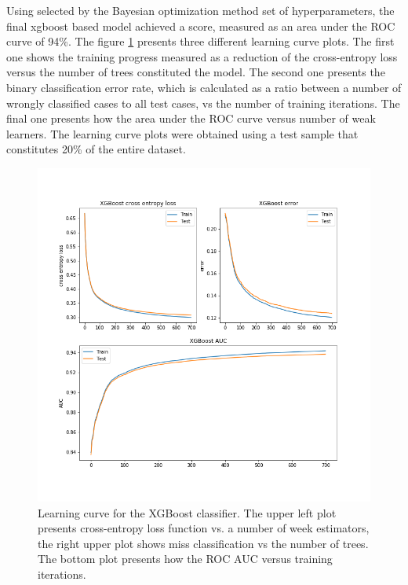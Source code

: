 Using selected by the Bayesian optimization method set of hyperparameters, the final xgboost based model achieved a score, measured as an area under the ROC curve of 94\%. The figure \ref{fig:xgboost trainig} presents three different learning curve plots. The first one shows the training progress measured as a reduction of the cross-entropy loss versus the number of trees constituted the model. The second one presents the binary classification error rate, which is calculated as a ratio between a number of wrongly classified cases to all test cases, vs the number of training iterations. The final one presents how the area under the ROC curve versus number of weak learners. The learning curve plots were obtained using a test sample that constitutes 20\% of the entire dataset. 


\begin{figure}
\centering
\hspace*{-1cm}\includegraphics{figures/learning_curve_xgboost.png}
\caption{Learning curve for the XGBoost classifier. The upper left plot presents cross-entropy loss function vs. a number of week estimators, the right upper plot shows miss classification vs the number of trees. The bottom plot presents how the ROC AUC versus training iterations.}
\label{fig:xgboost trainig}
\end{figure}


